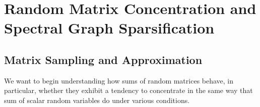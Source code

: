 
\chapter{Random Matrix Concentration and Spectral Graph
  Sparsification}
\label{cha:randmat}






%
\sloppy



\section{Matrix Sampling and Approximation}

We want to begin understanding how sums of random matrices behave, in
particular, whether they exhibit a tendency to concentrate in the same
way that sum of scalar random variables do under various conditions.

